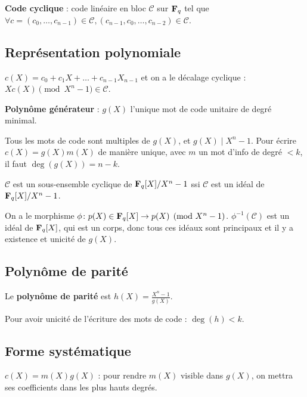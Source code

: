 \begin{defn}
	\textbf{Code cyclique} : code linéaire en bloc $\mathcal{C}$ sur $\mathbf{F}_q$ tel que $\forall c = (c_0,\ldots,c_{n - 1}) \in \mathcal{C}, (c_{n - 1},c_0,\ldots,c_{n - 2}) \in \mathcal{C}$.
\end{defn}

\subsection{Représentation polynomiale}

	$c(X) = c_0 + c_1 X + \ldots + c_{n - 1} X_{n - 1}$ et on a le décalage cyclique : $X c(X) \pmod{X^n - 1} \in \mathcal{C}$.
	
	\begin{defn}
		\textbf{Polynôme générateur} : $g(X)$ l'unique mot de code unitaire de degré minimal.
	\end{defn}

	Tous les mots de code sont multiples de $g(X)$, et $g(X) \mid X^n - 1$.
	Pour écrire $c(X) = g(X) m(X)$ de manière unique, avec $m$ un mot d'info de degré $<  k$, il faut $\deg(g(X)) = n - k$.

	\begin{thm}
		$\mathcal{C}$ est un sous-ensemble cyclique de $\mathbf{F}_q[X] / X^n - 1$ ssi $\mathcal{C}$ est un idéal de $\mathbf{F}_q[X] / X^n - 1$.
	\end{thm}

	On a le morphisme $\phi \colon p(X) \in \mathbf{F}_q[X] \to p(X) \pmod{X^n - 1}$.
	$\phi^{-1}(\mathcal{C})$ est un idéal de $\mathbf{F}_q[X]$, qui est un corps, donc tous ces idéaux sont principaux et il y a existence et unicité de $g(X)$.


\subsection{Polynôme de parité}

	\begin{defn}
		Le \textbf{polynôme de parité} est $h(X) = \frac{X^n - 1}{g(X)}$.
	\end{defn}

	Pour avoir unicité de l'écriture des mots de code : $\deg(h) < k$.


\subsection{Forme systématique}

	$c(X) = m(X)g(X)$ : pour rendre $m(X)$ visible dans $g(X)$, on mettra ses coefficients dans les plus hauts degrés.
	

